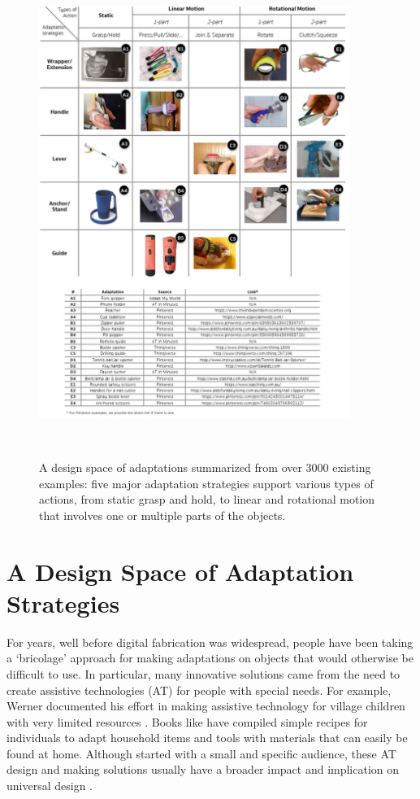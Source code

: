 \begin{figure}[!p]
  \centering
  \includegraphics[width=0.9\textwidth]{figures/reprise_adaptation_design_space_v2.pdf}
  \caption{A design space of adaptations summarized from over 3000 existing examples: five major adaptation strategies support various types of actions, from static grasp and hold, to linear and rotational motion that involves one or multiple parts of the objects.}~\label{fig:reprise_design_space}
\end{figure}

\section{A Design Space of Adaptation Strategies}
For years, well before digital fabrication was widespread, people have been taking a `bricolage' approach for making adaptations on objects that would otherwise be difficult to use. In particular, many innovative solutions came from the need to create assistive technologies (AT) for people with special needs. For example, Werner documented his effort in making assistive technology for village children with very limited resources \cite{werner1987disabled}. Books like \cite{plaxen2005adapt, willkolmm2013assistive, 9781933940021} have compiled simple recipes for individuals to adapt household items and tools with materials that can easily be found at home. Although started with a small and specific audience, these AT design and making solutions usually have a broader impact and implication on universal design \cite{de2011design}. 

